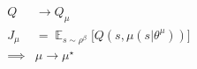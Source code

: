 \documentclass[10pt]{article}
\begin{document}
\begin{align*}Q   & \rightarrow   Q_{\mu} \\
J_{\mu} &  =  \mathop{\mathbb{E}}_{s \sim \rho^\beta}  \Big[ Q(s,\mu(s |\theta^\mu )) \Big] \\
\implies & \mu \rightarrow \mu^\star\end{align*}
\end{document}
